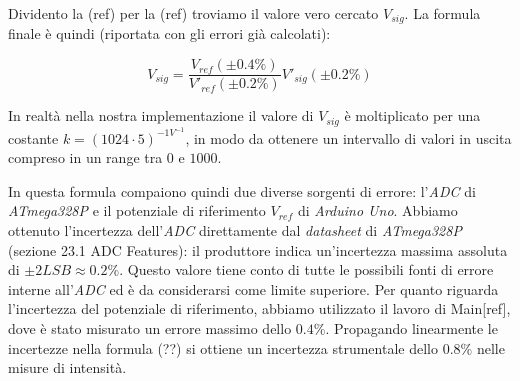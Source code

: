 \documentclass[12pt, a4paper, twoside]{article}
\begin{document}
    \noindent Dividento la (ref) per la (ref) troviamo il valore vero cercato $V_{sig}$.%
    La formula finale è quindi (riportata con gli errori già calcolati):

    \begin{equation}
      V_{sig} = \frac {
        V_{ref} (\pm 0.4\%)
      } {
        V'_{ref} (\pm 0.2\%)
      } V'_{sig} (\pm 0.2\%)
      \label{eq:misura-intensità}
    \end{equation}

    \noindent In realtà nella nostra implementazione il valore di $V_{sig}$ è
    moltiplicato per una costante $k = (1024 \cdot 5)^{-1 V^{-1}}$, in modo
    da ottenere un intervallo di valori in uscita compreso in un range tra $0$ e
    $1000$. %

    In questa formula compaiono quindi due diverse sorgenti di errore:
    l'\emph{ADC} di \emph{ATmega328P} e il potenziale di riferimento $V_{ref}$
    di \emph{Arduino Uno}.
    Abbiamo ottenuto l’incertezza dell’\emph{ADC} direttamente dal
    \emph{datasheet} di \emph{ATmega328P} (sezione 23.1 ADC  Features): %
    il produttore indica un'incertezza massima assoluta di $\pm 2LSB \approx 0.2\%$. %
    Questo valore tiene conto di tutte le possibili fonti di errore interne
    all’\emph{ADC} ed è da considerarsi come limite superiore.
    Per quanto riguarda l'incertezza del potenziale di riferimento, abbiamo
    utilizzato il lavoro di Main[ref], dove è stato misurato un errore %
    massimo dello $0.4\%$.
    Propagando linearmente le incertezze nella formula (??) si ottiene un incertezza
    strumentale dello $0.8\%$ nelle misure di intensità.
\end{document}
